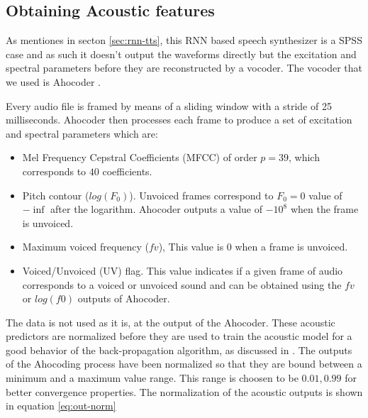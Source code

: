 
\subsection{Obtaining Acoustic features}

As mentiones in secton \ref{sec:rnn-tts}, this RNN based speech synthesizer is a SPSS case and as such it doesn't output the waveforms directly but the excitation and spectral parameters before they are reconstructed by a vocoder. The vocoder that we used is Ahocoder \cite{vocoder_ah}.

Every audio file is framed by means of a sliding window with a stride of 25 milliseconds. Ahocoder then processes each frame to produce a set of excitation and spectral parameters which are:

\begin{itemize}
    \item{Mel Frequency Cepstral Coefficients (MFCC) of order $p = 39$, which corresponds to $40$ coefficients.}
    \item{Pitch contour ($log(F_0)$). Unvoiced frames correspond to $F_0 = 0$ value of $-\inf$ after the logarithm. Ahocoder outputs a value of $-10^8$ when the frame is unvoiced.}
    \item{Maximum voiced frequency ($fv$), This value is 0 when a frame is unvoiced.}
    \item{Voiced/Unvoiced (UV) flag. This value indicates if a given frame of audio corresponds to a voiced or unvoiced sound and can be obtained using the $fv$ or $log(f0)$ outputs of Ahocoder.}
\end{itemize}

The data is not used as it is, at the output of the Ahocoder. These acoustic predictors are normalized before they are used to train the acoustic model for a good behavior of the back-propagation algorithm, as discussed in \cite{santi06}. The outputs of the Ahocoding process have been normalized so that they are bound between a minimum and a maximum value range. This range is choosen to be ${0.01, 0.99}$ for better convergence properties. The normalization of the acoustic outputs is shown in equation \ref{eq:out-norm}

